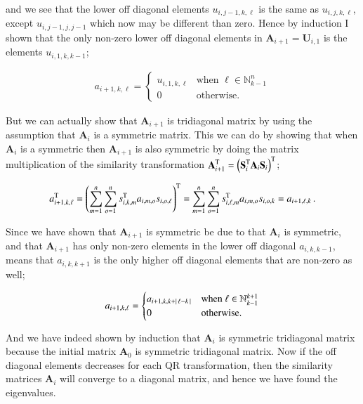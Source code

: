 \documentclass[11pt,english,a4paper]{article}
\begin{document}
\begin{flushleft}
and we see that the lower off diagonal elements $u_{i,j-1,k,\ell}$ is the same as $u_{i,j,k,\ell}$, except $u_{i,j-1,j,j-1}$ which now may be different than zero. Hence by induction I shown that the only non-zero lower off diagonal elements in $\textbf{A}_{i+1}=\textbf{U}_{i,1}$ is the elements $u_{i,1,k,k-1}$;

\begin{align*}
a_{i+1,k,\ell} = \begin{cases} u_{i,1,k,\ell} & \text{when } \ell\in\mathbb{N}_{k-1}^n \\ 0 & \text{otherwise.} \end{cases}
\end{align*}

But we can actually show that $\textbf{A}_{i+1}$ is tridiagonal matrix by using the assumption that $\textbf{A}_i$ is a symmetric matrix. This we can do by showing that when $\textbf{A}_i$ is a symmetric then $\textbf{A}_{i+1}$ is also symmetric by doing the matrix multiplication of the similarity transformation $\textbf{A}_{i+1}^{\text{T}} = \left({\textbf{S}_i^{\text{T}}\textbf{A}_i \textbf{S}_i}\right)^\text{T}$;

\begin{align*}
a_{i+1,k,\ell}^{\text{T}} = \left({\sum_{m=1}^n \sum_{o=1}^n s_{i,k,m}^{\text{T}}a_{i,m,o} s_{i,o,\ell}}\right)^{\text{T}} = \sum_{m=1}^n \sum_{o=1}^n s_{i,\ell,m}^{\text{T}}a_{i,m,o} s_{i,o,k} = a_{i+1,\ell,k} \,.
\end{align*}

Since we have shown that $\textbf{A}_{i+1}$ is symmetric be due to that $\textbf{A}_i$ is symmetric, and that $\textbf{A}_{i+1}$ has only non-zero elements in the lower off diagonal $a_{i,k,k-1}$, means that $a_{i,k,k+1}$ is the only higher off diagonal elements that are non-zero as well;

\begin{align*}
a_{i+1,k,\ell} = \begin{cases} a_{i+1,k,k+\left\vert{\,\ell-k\,}\right\vert} & \text{when } \ell \in \mathbb{N}_{k-1}^{k+1} \\ 0 & \text{otherwise.}\end{cases}
\end{align*}

And we have indeed shown by induction that $\textbf{A}_i$ is symmetric tridiagonal matrix because the initial matrix $\textbf{A}_0$ is symmetric tridiagonal matrix. Now if the off diagonal elements decreases for each QR transformation, then the similarity matrices $\textbf{A}_i$ will converge to a diagonal matrix, and hence we have found the eigenvalues. \linebreak


\end{flushleft}
\end{document}
